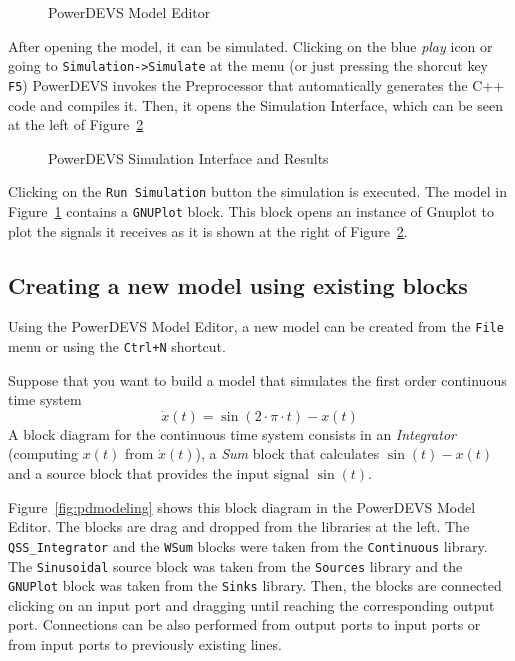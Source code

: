 \begin{figure}[h]
 \caption{PowerDEVS Model Editor}
 \label{fig:pdevsmodel}
\end{figure}

After opening the model, it can be simulated. Clicking on the blue \emph{play} icon or going to \verb"Simulation->Simulate" at the menu (or just pressing the shorcut key \verb"F5") PowerDEVS invokes the Preprocessor that automatically generates the C++ code and compiles it. Then, it opens the Simulation Interface, which can be seen at the left of Figure~\ref{fig:pdsimulation} 

\begin{figure}[h]
 \caption{PowerDEVS Simulation Interface and Results}
 \label{fig:pdsimulation}
\end{figure}

Clicking on the \verb"Run Simulation" button the simulation is executed. The model in Figure~\ref{fig:pdevsmodel} contains a \verb"GNUPlot" block. This block opens an instance of Gnuplot to plot the signals it receives as it is shown at the right of Figure~\ref{fig:pdsimulation}.

\subsection*{Creating a new model using existing blocks}
Using the PowerDEVS Model Editor, a new model can be created from the \verb"File" menu or using the \verb"Ctrl+N" shortcut.

Suppose that you want to build a model that simulates the first order continuous time system
\begin{equation*}
 \dot x(t)=\sin(2\cdot \pi \cdot t)-x(t)
\end{equation*}
A block diagram for the continuous time system consists in an \emph{Integrator} (computing $x(t)$ from $\dot x(t)$), a \emph{Sum} block that calculates $\sin(t)-x(t)$ and a source block that provides the input signal $\sin(t)$.

Figure~\ref{fig:pdmodeling}  shows this block diagram in the PowerDEVS Model Editor. The blocks are drag and dropped from the libraries at the left. The \verb"QSS_Integrator" and the \verb"WSum" blocks were taken from the \verb"Continuous" library. The \verb"Sinusoidal" source block was taken from the \verb"Sources" library and the \verb"GNUPlot" block was taken from the \verb"Sinks" library. Then, the blocks are connected clicking on an input port and dragging until reaching the corresponding output port. Connections can be also performed from output ports to input ports or from input ports to previously existing lines.


